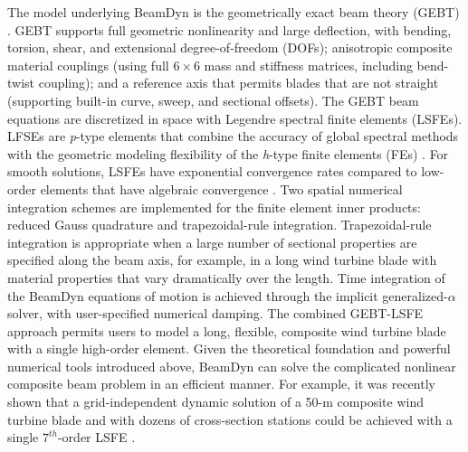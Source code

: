 The model underlying BeamDyn is the geometrically exact beam theory (GEBT) \cite{HodgesBeamBook}.   
GEBT supports full geometric nonlinearity and large deflection, with bending, torsion, shear, and extensional degree-of-freedom (DOFs); anisotropic composite material couplings (using full $6 \times 6$ mass and stiffness matrices, including bend-twist coupling); and a reference axis that permits blades that are not straight (supporting built-in curve, sweep, and sectional offsets). 
The GEBT beam equations are discretized in space with Legendre spectral finite elements (LSFEs).  
LFSEs are {\it p}-type elements that combine the accuracy of global spectral methods with the geometric modeling flexibility of the {\it h}-type finite elements (FEs) \cite{Patera:1984}. 
For smooth solutions, LSFEs have exponential convergence rates compared to low-order elements that have algebraic convergence \cite{Sprague:2003,Wang:SFE2013} .
Two spatial numerical integration schemes are implemented for the finite element inner products: reduced Gauss quadrature and trapezoidal-rule integration.  
Trapezoidal-rule integration is appropriate when a large number of sectional properties are specified along the beam axis, for example, in a long wind turbine blade with material properties that vary dramatically over the length.  
Time integration of the BeamDyn equations of motion is achieved through the implicit generalized-$\alpha$ solver, with user-specified numerical damping.
The combined GEBT-LSFE  approach permits users to model a long, flexible, composite wind turbine blade with a single high-order element.  
Given the theoretical foundation and powerful numerical tools introduced above, BeamDyn can solve the complicated nonlinear composite beam problem in an efficient manner. For example, it was recently shown that a grid-independent dynamic solution of a 50-m composite wind turbine blade and with dozens of cross-section stations could be achieved with a 
single $7^{th}$-order LSFE \cite{Wang:2016}.

